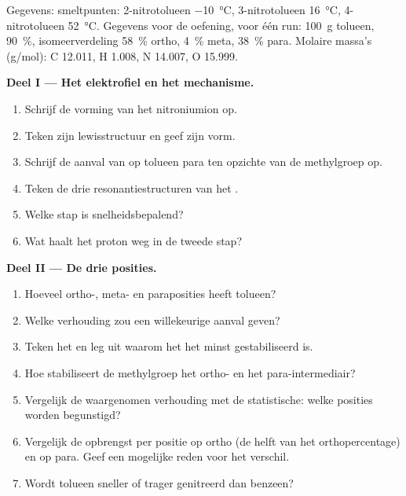 \begin{problem}
\label{pb:b2:aromatic-substitution:1}
Gegevens: smeltpunten: 2-nitrotolueen \qty{-10}{\degreeCelsius}, 3-nitrotolueen
\qty{16}{\degreeCelsius}, 4-nitrotolueen \qty{52}{\degreeCelsius}. Gegevens voor de oefening, voor één run:
\qty{100}{g} tolueen,  90~\%, isomeerverdeling 58~\% ortho, 4~\% meta,
38~\% para. Molaire massa's (\unit{g/mol}): C 12.011, H 1.008, N 14.007, O 15.999.

\medskip
\noindent\textbf{Deel I --- Het elektrofiel en het mechanisme.}
\begin{enumerate}
  \item Schrijf de vorming van het nitroniumion op.
  \item Teken zijn lewisstructuur en geef zijn vorm.
  \item Schrijf de aanval van  op tolueen para ten opzichte van de methylgroep op.
  \item Teken de drie resonantiestructuren van het .
  \item Welke stap is snelheidsbepalend?
  \item Wat haalt het proton weg in de tweede stap?
\end{enumerate}

\medskip
\noindent\textbf{Deel II --- De drie posities.}
\begin{enumerate}[resume]
  \item Hoeveel ortho-, meta- en paraposities heeft tolueen?
  \item Welke verhouding zou een willekeurige aanval geven?
  \item Teken het  en leg uit waarom het het minst gestabiliseerd is.
  \item Hoe stabiliseert de methylgroep het ortho- en het para-intermediair?
  \item Vergelijk de waargenomen verhouding met de statistische: welke posities worden begunstigd?
  \item Vergelijk de opbrengst per positie op ortho (de helft van het orthopercentage) en op para.
        Geef een mogelijke reden voor het verschil.
  \item Wordt tolueen sneller of trager genitreerd dan benzeen?
\end{enumerate}


\end{problem}

